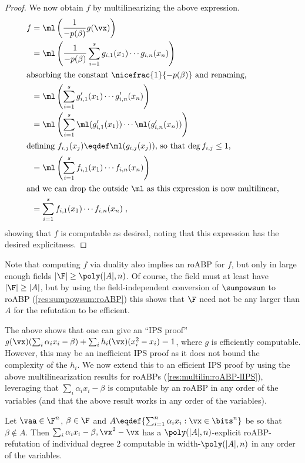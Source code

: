 \documentclass[11pt]{article}
\numberwithin{equation}{section}
\theoremstyle{definition}
\theoremstyle{plain}
\begin{document}
\begin{proof}
        We now obtain $f$ by multilinearizing the above expression.
        \begin{align*}
                f
                &=\ml\left(\frac{1}{-p(\beta)} g(\vx)\right)\\
                &=\ml\left(\frac{1}{-p(\beta)} \sum_{i=1}^{s} g_{i,1}(x_1)\cdots g_{i,n}(x_n)\right)\\
                \intertext{absorbing the constant $\nicefrac{1}{-p(\beta)}$ and renaming,}
                &=\ml\left(\sum_{i=1}^{s} g'_{i,1}(x_1)\cdots g'_{i,n}(x_n)\right)\\
                &=\ml\left(\sum_{i=1}^{s} \ml(g'_{i,1}(x_1))\cdots \ml(g'_{i,n}(x_n))\right)\\
                \intertext{defining $f_{i,j}(x_j)\eqdef \ml(g_{i,j}(x_j))$, so that $\deg f_{i,j}\le 1$,}
                &=\ml\left(\sum_{i=1}^{s} f_{i,1}(x_1)\cdots f_{i,n}(x_n)\right)\\
                \intertext{and we can drop the outside $\ml$ as this expression is now multilinear,}
                &=\sum_{i=1}^{s} f_{i,1}(x_1)\cdots f_{i,n}(x_n)
                \;,
        \end{align*}
        showing that $f$ is computable as desired, noting that this expression has the desired explicitness. %
\end{proof}

Note that computing $f$ via duality also implies an roABP for $f$, but only in large enough fields $|\F|\ge\poly(|A|,n)$.  Of course, the field must at least have $|\F|\ge |A|$, but by using the field-independent conversion of $\sumpowsum$ to roABP (\autoref{res:sumpowsum:roABP}) this shows that $\F$ need not be any larger than $A$ for the refutation to be efficient.

The above shows that one can give an ``IPS proof'' $g(\vx)(\sum_i \alpha_ix_i-\beta)+\sum_i h_i(\vx)(x_i^2-x_i)=1$, where $g$ is efficiently computable.  However, this may be an inefficient IPS proof as it does not bound the complexity of the $h_i$. We now extend this to an efficient IPS proof by using the above multilinearization results for roABPs (\autoref{res:multilin:roABP-lIPS}), leveraging that $\sum_i \alpha_ix_i-\beta$ is computable by an roABP in any order of the variables (and that the above result works in any order of the variables).

\begin{corollarywp}\label{res:ips-ubs:subset:roABP}
        Let $\vaa\in\F^n$, $\beta\in\F$ and $A\eqdef\{\sum_{i=1}^n \alpha_i x_i : \vx\in\bits^n\}$ be so that $\beta\notin A$.  Then $\sum_i \alpha_ix_i-\beta,\vx^2-\vx$ has a $\poly(|A|,n)$-explicit roABP-\lIPS refutation of individual degree $2$ computable in width-$\poly(|A|,n)$ in any order of the variables.
\end{corollarywp}
\end{document}
